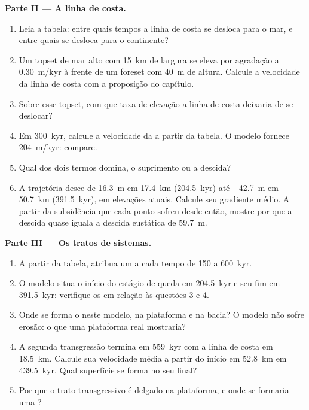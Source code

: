 \begin{problem}
\medskip\noindent\textbf{Parte II --- A linha de costa.}
\begin{enumerate}[resume]
\item Leia a tabela: entre quais tempos a linha de costa se desloca para o mar,
  e entre quais se desloca para o continente?
\item Um topset de mar alto com \qty{15}{km} de largura se eleva por agradação a \qty{0.30}{m/kyr}
  à frente de um foreset com \qty{40}{m} de altura. Calcule a velocidade da
  linha de costa com a proposição do capítulo.
\item Sobre esse topset, com que taxa de elevação a linha de costa deixaria de se deslocar?
\item Em \qty{300}{kyr}, calcule a velocidade da  a partir
  da tabela. O modelo fornece \qty{204}{m/kyr}: compare.
\item Qual dos dois termos domina, o suprimento ou a descida?
\item A trajetória desce de \qty{16.3}{m} em \qty{17.4}{km}
  (\qty{204.5}{kyr}) até \qty{-42.7}{m} em \qty{50.7}{km}
  (\qty{391.5}{kyr}), em elevações atuais. Calcule seu gradiente médio.
  A partir da subsidência que cada ponto sofreu desde então, mostre por que a descida
  quase iguala a descida eustática de \qty{59.7}{m}.
\end{enumerate}

\medskip\noindent\textbf{Parte III --- Os tratos de sistemas.}
\begin{enumerate}[resume]
\item A partir da tabela, atribua um  a cada tempo de 150 a
  \qty{600}{kyr}.
\item O modelo situa o início do estágio de queda em \qty{204.5}{kyr}
  e seu fim em \qty{391.5}{kyr}: verifique-os em relação às questões 3 e 4.
\item Onde se forma o  neste modelo, na plataforma e
  na bacia? O modelo não sofre erosão: o que uma plataforma real mostraria?
\item A segunda transgressão termina em \qty{559}{kyr} com a linha de costa em
  \qty{18.5}{km}. Calcule sua velocidade média a partir do início em \qty{52.8}{km}
  em \qty{439.5}{kyr}. Qual superfície se forma no seu final?
\item Por que o trato transgressivo é delgado na plataforma, e onde se formaria
  uma ?
\end{enumerate}


\end{problem}
